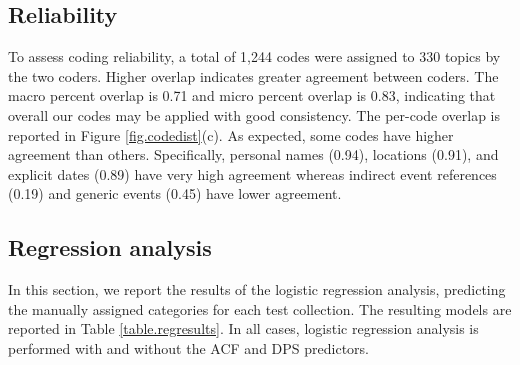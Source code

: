 \documentclass{sig-alternate}
\begin{document}

\subsection{Reliability}

To assess coding reliability, a total of 1,244 codes were assigned to 330 topics by the two coders. Higher overlap indicates greater agreement between coders. The macro percent overlap is 0.71 and  micro percent overlap is 0.83, indicating that overall our codes may be applied with good consistency. The per-code overlap is reported in Figure \ref{fig.codedist}(c). As expected, some codes have higher agreement than others. Specifically, personal names (0.94), locations (0.91), and explicit dates (0.89) have very high agreement whereas indirect event references (0.19) and generic events (0.45) have lower agreement.



\subsection{Regression analysis}

In this section, we report the results of the logistic regression analysis, predicting the manually assigned categories for each test collection. The resulting models are reported in Table \ref{table.regresults}. In all cases, logistic regression analysis is performed with and without the ACF and DPS predictors.
\end{document}
